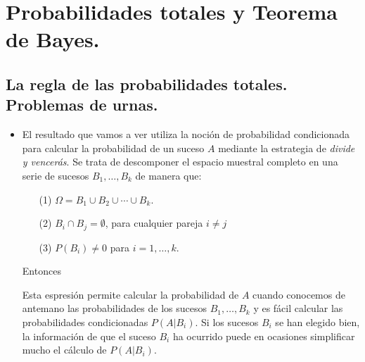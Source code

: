 \section{Probabilidades totales y Teorema de Bayes.}\label{cap04:sec:ProbabilidadesTotalesReglaBayes}


\subsection{La regla de las probabilidades totales. Problemas de urnas.}\label{Sesion08:subsec:ProbabilidadesTotales}

\begin{itemize}

    \item El resultado que vamos a ver utiliza la noción de probabilidad condicionada para calcular la probabilidad de un suceso $A$ mediante la estrategia de {\em divide y vencerás}.  Se trata de descomponer el espacio muestral completo en una serie de sucesos $B_1,\ldots,B_k$ de manera que:
        \begin{enumerate}
            \item[(1)] $\Omega=B_1\cup B_2\cup\cdots\cup B_k.$
            \item[(2)] $B_i\cap B_j=\emptyset$, para cualquier pareja $i\neq j$
            \item[(3)] $P(B_i)\neq 0$ para $i=1,\ldots,k$.
        \end{enumerate}
        Entonces
        \begin{center}
        \end{center}
        Esta espresión permite calcular la probabilidad de $A$ cuando conocemos de antemano las probabilidades de los sucesos $B_1,\ldots,B_k$ y es fácil calcular las probabilidades condicionadas $P(A|B_i)$. Si los sucesos $B_i$ se han elegido bien, la información de que el suceso $B_i$ ha ocurrido puede en ocasiones simplificar mucho el cálculo de $P(A|B_i)$.


\end{itemize}
